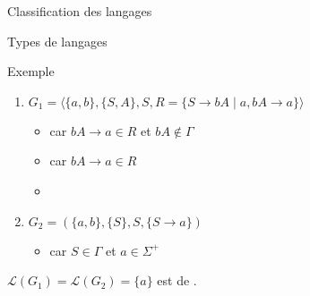 \begin{frame}{Classification des langages}
\begin{minipage}{.5\textwidth}
\begin{block}{Types de langages}
{}
    \end{block}
  \end{minipage}

    \vspace{-1mm}
  \begin{exampleblock}{Exemple}
    \vspace{-2mm}
    \begin{enumerate}
    \item $G_1 = \langle \{a,b\},\{S,A\},S,R=\{ S \rightarrow  bA  \;|\;  a, bA \rightarrow a\}\rangle$\\
      \begin{itemize}
      \item  {} car $bA \rightarrow a\in R$ et $bA\not\in \Gamma$
      \item  {} car $bA \rightarrow a\in R$
      \item  {}
      \end{itemize}
    \item $G_2 = (\{a,b\},\{S\},S,\{S \rightarrow a\})$
      \begin{itemize}
      \item {} car $S\in \Gamma$ et $a\in \Sigma^+$
      \end{itemize}
    \end{enumerate}
    $\mathcal{L}(G_1) = \mathcal{L}(G_2) = \{a\}$ est de .
  \end{exampleblock}
\end{frame}

\endgroup
